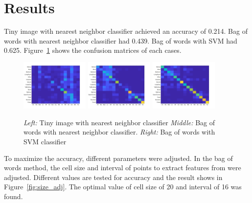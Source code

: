 \section*{Results}
Tiny image with nearest neighbor classifier achieved an accuracy of 0.214. Bag of words with nearest neighbor classifier had 0.439. Bag of words with SVM had 0.625. Figure~\ref{fig:conf} shows the confusion matrices of each cases.\\
\begin{figure}[H]
	\centering
	\includegraphics[width=0.3\textwidth]{../code/ti_nn.png}
	\includegraphics[width=0.3\textwidth]{../code/bw_nn.png}
	\includegraphics[width=0.3\textwidth]{../code/bw_svm.png}
	\caption{\emph{Left:} Tiny image with nearest neighbor classifier \emph{Middle:} Bag of words with nearest neighbor classifier. \emph{Right:} Bag of words with SVM classifier}
	\label{fig:conf}
\end{figure}
To maximize the accuracy, different parameters were adjusted. In the bag of words method, the cell size and interval of points to extract features from were adjusted. Different values are tested for accuracy and the result shows in Figure~\ref{fig:size_adj}. The optimal value of cell size of 20 and interval of 16 was found. \\

